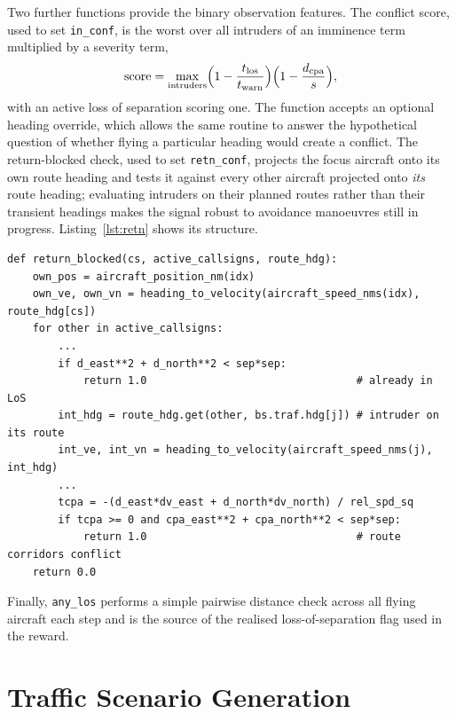 Two further functions provide the binary observation features. The conflict score, used to set \texttt{in\_conf}, is the worst over all intruders of an imminence term multiplied by a severity term,
\begin{equation}
\label{eq:cscore}
\text{score} = \max_{\text{intruders}} \Bigl(1 - \frac{t_{\text{los}}}{t_{\text{warn}}}\Bigr)\Bigl(1 - \frac{d_{\text{cpa}}}{s}\Bigr),
\end{equation}
with an active loss of separation scoring one. The function accepts an optional heading override, which allows the same routine to answer the hypothetical question of whether flying a particular heading would create a conflict. The return-blocked check, used to set \texttt{retn\_conf}, projects the focus aircraft onto its own route heading and tests it against every other aircraft projected onto \emph{its} route heading; evaluating intruders on their planned routes rather than their transient headings makes the signal robust to avoidance manoeuvres still in progress. Listing~\ref{lst:retn} shows its structure.

\begin{lstlisting}[caption={The ``safe to return'' check (\texttt{conflict.py}, abridged).}, label={lst:retn}]
def return_blocked(cs, active_callsigns, route_hdg):
    own_pos = aircraft_position_nm(idx)
    own_ve, own_vn = heading_to_velocity(aircraft_speed_nms(idx), route_hdg[cs])
    for other in active_callsigns:
        ...
        if d_east**2 + d_north**2 < sep*sep:
            return 1.0                                 # already in LoS
        int_hdg = route_hdg.get(other, bs.traf.hdg[j]) # intruder on its route
        int_ve, int_vn = heading_to_velocity(aircraft_speed_nms(j), int_hdg)
        ...
        tcpa = -(d_east*dv_east + d_north*dv_north) / rel_spd_sq
        if tcpa >= 0 and cpa_east**2 + cpa_north**2 < sep*sep:
            return 1.0                                 # route corridors conflict
    return 0.0
\end{lstlisting}

Finally, \texttt{any\_los} performs a simple pairwise distance check across all flying aircraft each step and is the source of the realised loss-of-separation flag used in the reward.


\section{Traffic Scenario Generation}
\label{sec:method_scenario}


